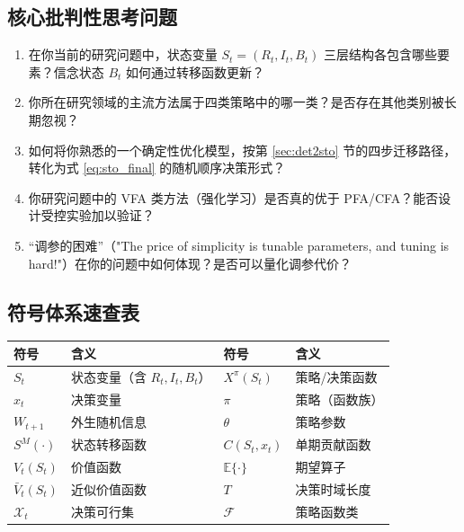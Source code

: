 \documentclass[11pt, a4paper]{article}
\begin{document}
\subsection{核心批判性思考问题}

\begin{enumerate}[leftmargin=2em, label=\textbf{Q\arabic*.}, itemsep=4pt]
  \item 在你当前的研究问题中，状态变量 $S_t = (R_t, I_t, B_t)$ 三层结构各包含哪些要素？信念状态 $B_t$ 如何通过转移函数更新？

  \item 你所在研究领域的主流方法属于四类策略中的哪一类？是否存在其他类别被长期忽视？

  \item 如何将你熟悉的一个确定性优化模型，按第 \ref{sec:det2sto} 节的四步迁移路径，转化为式 \eqref{eq:sto_final} 的随机顺序决策形式？

  \item 你研究问题中的 VFA 类方法（强化学习）是否真的优于 PFA/CFA？能否设计受控实验加以验证？

  \item ``调参的困难''（"The price of simplicity is tunable parameters, and tuning is hard!"）在你的问题中如何体现？是否可以量化调参代价？
\end{enumerate}

\subsection{符号体系速查表}

\begin{center}
\begin{tabular}{ll|ll}
\toprule
\textbf{符号} & \textbf{含义} & \textbf{符号} & \textbf{含义} \\
\midrule
$S_t$ & 状态变量（含 $R_t, I_t, B_t$） & $X^\pi(S_t)$ & 策略/决策函数 \\
$x_t$ & 决策变量 & $\pi$ & 策略（函数族） \\
$W_{t+1}$ & 外生随机信息 & $\theta$ & 策略参数 \\
$S^M(\cdot)$ & 状态转移函数 & $C(S_t, x_t)$ & 单期贡献函数 \\
$V_t(S_t)$ & 价值函数 & $\mathbb{E}\{\cdot\}$ & 期望算子 \\
$\bar{V}_t(S_t)$ & 近似价值函数 & $T$ & 决策时域长度 \\
$\mathcal{X}_t$ & 决策可行集 & $\mathcal{F}$ & 策略函数类 \\
\bottomrule
\end{tabular}
\end{center}
\end{document}

